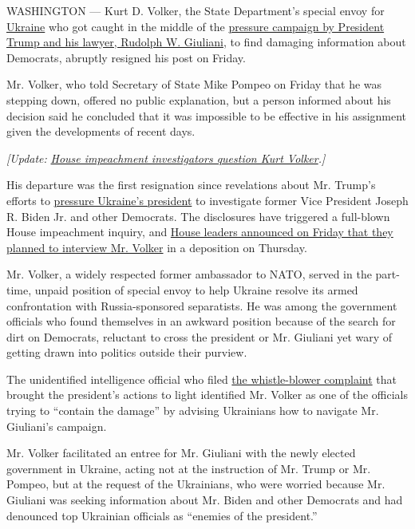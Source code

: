 WASHINGTON --- Kurt D. Volker, the State Department's special envoy for
\href{https://www.nytimes.com/2019/09/28/us/politics/democrats-impeachment.html}{Ukraine}
who got caught in the middle of the
\href{https://www.nytimes.com/2019/09/25/us/politics/donald-trump-impeachment-probe.html}{pressure
campaign by President Trump and his lawyer, Rudolph W. Giuliani}, to
find damaging information about Democrats, abruptly resigned his post on
Friday.

Mr. Volker, who told Secretary of State Mike Pompeo on Friday that he
was stepping down, offered no public explanation, but a person informed
about his decision said he concluded that it was impossible to be
effective in his assignment given the developments of recent days.

\emph{{[}Update:}
\href{https://www.nytimes.com/2019/10/03/us/politics/kurt-volker-impeachment.html}{\emph{House
impeachment investigators question Kurt Volker}}\emph{.{]}}

His departure was the first resignation since revelations about Mr.
Trump's efforts to
\href{https://www.nytimes.com/interactive/2019/09/25/us/politics/trump-ukraine-transcript.html?module=inline}{pressure
Ukraine's president} to investigate former Vice President Joseph R.
Biden Jr. and other Democrats. The disclosures have triggered a
full-blown House impeachment inquiry, and
\href{https://www.nytimes.com/2019/09/27/us/politics/house-democrats-impeachment-trump.html}{House
leaders announced on Friday that they planned to interview Mr. Volker}
in a deposition on Thursday.

Mr. Volker, a widely respected former ambassador to NATO, served in the
part-time, unpaid position of special envoy to help Ukraine resolve its
armed confrontation with Russia-sponsored separatists. He was among the
government officials who found themselves in an awkward position because
of the search for dirt on Democrats, reluctant to cross the president or
Mr. Giuliani yet wary of getting drawn into politics outside their
purview.

The unidentified intelligence official who filed
\href{https://www.nytimes.com/2019/09/26/us/politics/whistleblower-complaint-released.html?action=click\&module=inline\&pgtype=Homepage}{the
whistle-blower complaint} that brought the president's actions to light
identified Mr. Volker as one of the officials trying to ``contain the
damage'' by advising Ukrainians how to navigate Mr. Giuliani's campaign.

Mr. Volker facilitated an entree for Mr. Giuliani with the newly elected
government in Ukraine, acting not at the instruction of Mr. Trump or Mr.
Pompeo, but at the request of the Ukrainians, who were worried because
Mr. Giuliani was seeking information about Mr. Biden and other Democrats
and had denounced top Ukrainian officials as ``enemies of the
president.''

